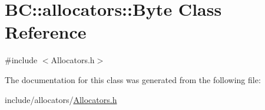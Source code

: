 \hypertarget{classBC_1_1allocators_1_1Byte}{}\section{BC\+:\+:allocators\+:\+:Byte Class Reference}
\label{classBC_1_1allocators_1_1Byte}


{\ttfamily \#include $<$Allocators.\+h$>$}



The documentation for this class was generated from the following file\+:\begin{DoxyCompactItemize}
\item 
include/allocators/\hyperlink{Allocators_8h}{Allocators.\+h}\end{DoxyCompactItemize}
